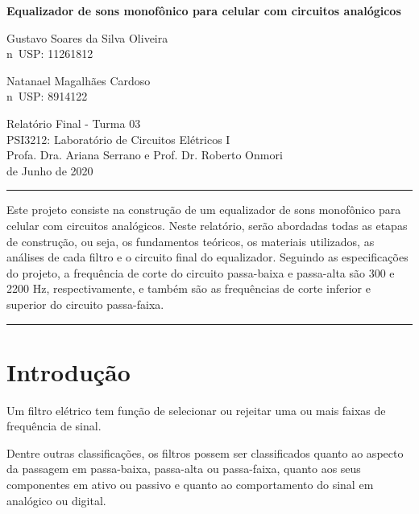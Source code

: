 \documentclass{article}
\begin{document}
\begin{center}
  {\Large\bfseries Equalizador de sons monofônico para celular com circuitos analógicos}\\
\end{center}
\bigskip
\begin{minipage}{.49\textwidth}
  \centering
  Gustavo Soares da Silva Oliveira\\
  n\textordmasculine\ USP: 11261812
\end{minipage}
\begin{minipage}{.49\textwidth}
  \centering
  Natanael Magalhães Cardoso\\
  n\textordmasculine\ USP: 8914122
\end{minipage}
\medbreak
\begin{center}
  Relatório Final - Turma 03\\
  PSI3212: Laboratório de Circuitos Elétricos I\\
  Profa. Dra. Ariana Serrano e Prof. Dr. Roberto Onmori\\
   de Junho de 2020
\end{center}

\renewenvironment{abstract}
{\quotation\small\noindent\rule{\linewidth}{.5pt}\par\smallskip
  {\centering\bfseries\abstractname\par}\medskip}
{\par\noindent\rule{\linewidth}{.5pt}\endquotation}

\begin{abstract}
  Este projeto consiste na construção de um equalizador de sons monofônico para celular com circuitos analógicos. Neste relatório, serão abordadas todas as etapas de construção, ou seja, os fundamentos teóricos, os materiais utilizados, as análises de cada filtro e o circuito final do equalizador. Seguindo as especificações do projeto, a frequência de corte do circuito passa-baixa e passa-alta são 300 e 2200 Hz, respectivamente, e também são as frequências de corte inferior e superior do circuito passa-faixa.
\end{abstract}

\section{Introdução}
Um filtro elétrico tem função de selecionar ou rejeitar uma ou mais faixas de frequência de sinal.

Dentre outras classificações, os filtros possem ser classificados quanto ao aspecto da passagem em passa-baixa, passa-alta ou passa-faixa, quanto aos seus componentes em ativo ou passivo e quanto ao comportamento do sinal em analógico ou digital. \cite{wiki-filtro-eletronico}
\end{document}
